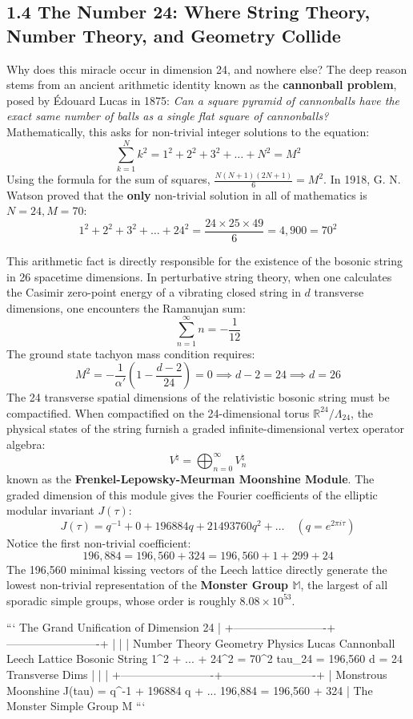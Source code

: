 \documentclass[11pt,twoside,openright]{amsbook}
\begin{document}
\subsection{1.4 The Number 24: Where String Theory, Number Theory, and Geometry Collide}

Why does this miracle occur in dimension 24, and nowhere else?
The deep reason stems from an ancient arithmetic identity known as the \textbf{cannonball problem}, posed by Édouard Lucas in 1875: \textit{Can a square pyramid of cannonballs have the exact same number of balls as a single flat square of cannonballs?}
Mathematically, this asks for non-trivial integer solutions to the equation:
$$\sum_{k=1}^N k^2 = 1^2 + 2^2 + 3^2 + \dots + N^2 = M^2$$
Using the formula for the sum of squares, $\frac{N(N+1)(2N+1)}{6} = M^2$. 
In 1918, G. N. Watson proved that the \textbf{only} non-trivial solution in all of mathematics is $N = 24, M = 70$:
$$1^2 + 2^2 + 3^2 + \dots + 24^2 = \frac{24 \times 25 \times 49}{6} = 4,900 = 70^2$$

This arithmetic fact is directly responsible for the existence of the bosonic string in 26 spacetime dimensions. In perturbative string theory, when one calculates the Casimir zero-point energy of a vibrating closed string in $d$ transverse dimensions, one encounters the Ramanujan sum:
$$\sum_{n=1}^\infty n = -\frac{1}{12}$$
The ground state tachyon mass condition requires:
$$M^2 = -\frac{1}{\alpha'} \left( 1 - \frac{d - 2}{24} \right) = 0 \implies d - 2 = 24 \implies d = 26$$
The 24 transverse spatial dimensions of the relativistic bosonic string must be compactified. When compactified on the 24-dimensional torus $\mathbb{R}^{24} / \Lambda_{24}$, the physical states of the string furnish a graded infinite-dimensional vertex operator algebra:
$$V^\natural = \bigoplus_{n=0}^\infty V_n^\natural$$
known as the \textbf{Frenkel-Lepowsky-Meurman Moonshine Module}. The graded dimension of this module gives the Fourier coefficients of the elliptic modular invariant $J(\tau)$:
$$J(\tau) = q^{-1} + 0 + 196884 q + 21493760 q^2 + \dots \quad (q = e^{2\pi i \tau})$$
Notice the first non-trivial coefficient:
$$196,884 = 196,560 + 324 = 196,560 + 1 + 299 + 24$$
The 196,560 minimal kissing vectors of the Leech lattice directly generate the lowest non-trivial representation of the \textbf{Monster Group $\mathbb{M}$}, the largest of all sporadic simple groups, whose order is roughly $8.08 \times 10^{53}$.

```
                 The Grand Unification of Dimension 24
                                   |
         +-------------------------+-------------------------+
         |                         |                         |
   Number Theory               Geometry                  Physics
  Lucas Cannonball          Leech Lattice             Bosonic String
  1^2 + ... + 24^2 = 70^2   tau_24 = 196,560         d = 24 Transverse Dims
         |                         |                         |
         +-------------------------+-------------------------+
                                   |
                         Monstrous Moonshine
                       J(tau) = q^-1 + 196884 q + ...
                         196,884 = 196,560 + 324
                                   |
                        The Monster Simple Group M
```
\end{document}
